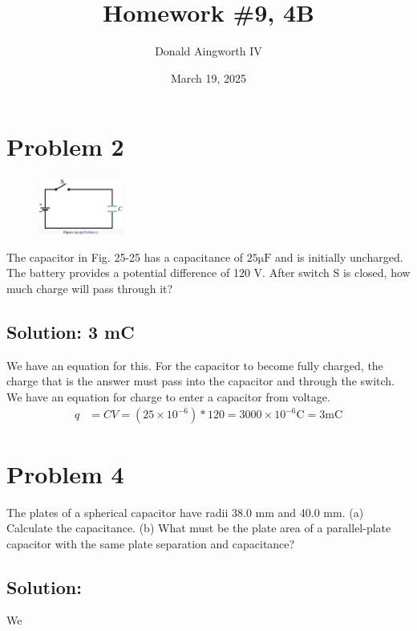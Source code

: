 \documentclass[12pt]{article}
\title{Homework \#9, 4B}
\author{Donald Aingworth IV}
\date{March 19, 2025}
\begin{document}

\maketitle

\pagebreak
\section{Problem 2}
\begin{figure}
    \vspace{-30pt}
    \includegraphics[width=0.25\textwidth]{picture_1.png} 
\end{figure}
The capacitor in Fig. 25-25 has a capacitance of $25 \unit{\micro\farad}$ and is initially uncharged. 
The battery provides a potential difference of 120 V. 
After switch S is closed, how much charge will pass through it?

\subsection*{Solution: 3 mC}
We have an equation for this. 
For the capacitor to become fully charged, the charge that is the answer must pass into the capacitor and through the switch.
We have an equation for charge to enter a capacitor from voltage.
\begin{align*}
    q   &=  CV
        =   (25 \times 10^{-6}) * 120
        =   3000 \times 10^{-6} \unit{\coulomb}
        =   \boxed{\boxed{3 \unit{\milli\coulomb}}}
\end{align*}

\pagebreak
\section{Problem 4}
The plates of a spherical capacitor have radii 38.0 mm and 40.0 mm. 
(a) Calculate the capacitance. 
(b) What must be the plate area of a parallel-plate capacitor with the same plate separation and capacitance?

\subsection{Solution: }
We 
\end{document}
